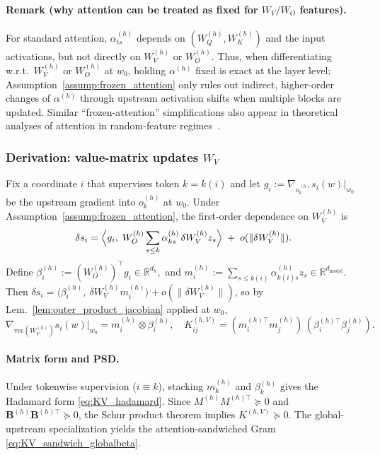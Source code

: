 \documentclass{article}
\theoremstyle{plain}
\theoremstyle{definition}
\theoremstyle{remark}
\begin{document}
\paragraph{Remark (why attention can be treated as fixed for $W_V/W_O$ features).}
For standard attention, $\alpha^{(h)}_{ts}$ depends on $(W_Q^{(h)},W_K^{(h)})$ and the input activations,
but not directly on $W_V^{(h)}$ or $W_O^{(h)}$.
Thus, when differentiating w.r.t.\ $W_V^{(h)}$ or $W_O^{(h)}$ at $w_0$, holding $\alpha^{(h)}$ fixed is exact at the layer level;
Assumption~\ref{assump:frozen_attention} only rules out indirect, higher-order changes of $\alpha^{(h)}$ through upstream activation shifts when multiple blocks are updated.
Similar “frozen-attention” simplifications also appear in theoretical analyses of attention in random-feature regimes~\citep{fu2023single_attention}.


\subsubsection{Derivation: value-matrix updates $W_V$}
Fix a coordinate $i$ that supervises token $k=k(i)$ and let $g_i:=\nabla_{o_k^{(h)}} s_i(w)\big|_{w_0}$ be the upstream gradient into $o_k^{(h)}$ at $w_0$.
Under Assumption~\ref{assump:frozen_attention}, the first-order dependence on $W_V^{(h)}$ is
\[
\delta s_i = \Bigl\langle g_i,\; W_O^{(h)}\sum_{s\le k}\alpha_{ks}^{(h)}\, \delta W_V^{(h)} z_s\Bigr\rangle
\;+\; o(\|\delta W_V^{(h)}\|).
\]
Define $\beta_i^{(h)} := (W_O^{(h)})^\top g_i \in\mathbb{R}^{d_h},$ and $m_i^{(h)} := \sum_{s\le k(i)} \alpha_{k(i)s}^{(h)} z_s \in\mathbb{R}^{d_{\mathrm{model}}}$. Then $\delta s_i=\langle \beta_i^{(h)},\ \delta W_V^{(h)} m_i^{(h)}\rangle + o(\|\delta W_V^{(h)}\|)$, so by
Lem.~\ref{lem:outer_product_jacobian} applied at $w_0$,
$
\nabla_{\mathrm{vec}(W_V^{(h)})} s_i(w)\big|_{w_0} = m_i^{(h)}\otimes \beta_i^{(h)},
\quad
K_{ij}^{(h,V)} = (m_i^{(h)\top}m_j^{(h)})\,(\beta_i^{(h)\top}\beta_j^{(h)}).
$

\paragraph{Matrix form and PSD.}
Under tokenwise supervision ($i\equiv k$), stacking $m_k^{(h)}$ and $\beta_k^{(h)}$ gives the Hadamard form
\eqref{eq:KV_hadamard}. Since $M^{(h)}M^{(h)\top}\succeq 0$ and $\mathbf{B}^{(h)}\mathbf{B}^{(h)\top}\succeq 0$,
the Schur product theorem implies $K^{(h,V)}\succeq 0$.
The global-upstream specialization yields the attention-sandwiched Gram \eqref{eq:KV_sandwich_globalbeta}.
\end{document}
